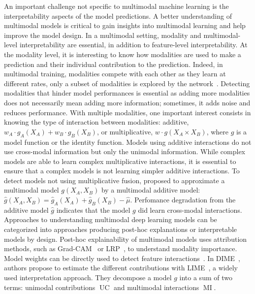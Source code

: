 \documentclass[../main.tex]{subfiles}
\begin{document}
		An important challenge not specific to multimodal machine learning is the interpretability aspects of the model predictions.
		A better understanding of multimodal models is critical to gain insights into multimodal learning and help improve the model design.
		In a multimodal setting, modality and multimodal-level interpretability are essential, in addition to feature-level interpretability.
		At the modality level, it is interesting to know how modalities are used to make a prediction and their individual contribution to the prediction.
		Indeed, in multimodal training, modalities compete with each other as they learn at different rates, only a subset of modalities is explored by the network~\cite{pmlr-v162-huang22e}.
		Detecting modalities that hinder model performances is essential as adding more modalities does not necessarily mean adding more information; sometimes, it adds noise and reduces performance.
		With multiple modalities, one important interest consists in knowing the type of interaction between modalities: additive, \( w_A\cdot g_A\left(X_A\right) + w_B\cdot g_B\left(X_B\right)\),  or multiplicative, \(w\cdot  g\left( X_A \times X_B\right)\), where \(g\) is a model function or the identity function.
		Models using additive interactions do not use cross-modal information but only the unimodal information.
		While complex models are able to learn complex multiplicative interactions, it is essential to ensure that a complex models is not learning simpler additive interactions.
		To detect models not using multiplicative fusion, \citeauthor{EMAP} proposed to approximate a multimodal model \(g\left(X_A,X_B\right)\) by a multimodal additive model: \(\hat{g}\left(X_A,X_B\right) = \hat{g}_A\left(X_A\right) + \hat{g}_B\left(X_B\right) - \hat{\mu}\).
		Perfomance degradation from the additive model \(\hat{g}\) indicates that the model \(g\) did learn cross-modal interactions.
		Approaches to understanding multimodal deep learning models can be categorized into approaches producing post-hoc explanations or interpretable models by design.
		Post-hoc explainability of multimodal models uses attribution methods, such as Grad-CAM~\cite{Chandrasekaran2018DoEM} or LRP~\cite{Ellis2021}, to understand modality importance. %
		Model weights can be directly used to detect feature interactions~\cite{tsang2017detecting}.
		In DIME~\cite{DIME}, authors propose to estimate the different contributions with LIME~\cite{LIME}, a widely used interpretation approach.
		They decompose a model \(g\) into a sum of two terms: unimodal contributions \(\operatorname{UC}\) and multimodal interactions \(\operatorname{MI}\).
\end{document}
